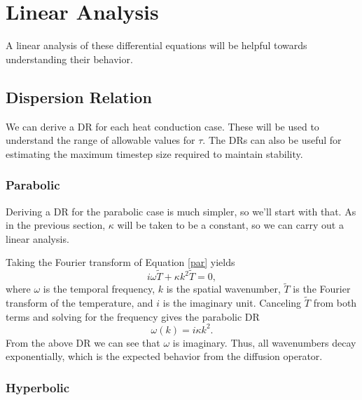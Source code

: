 \documentclass[iop]{emulateapj}
\begin{document}
	\section{Linear Analysis}
	
			A linear analysis of these differential equations will be helpful towards understanding their behavior.
	
		\subsection{Dispersion Relation}
		
				We can derive a \ac{DR} for each heat conduction case.
					These will be used to understand the range of allowable values for $\tau$.
					The \ac{DR}s can also be useful for estimating the maximum timestep size required to maintain stability.
					
			\subsubsection{Parabolic}
			
				Deriving a \ac{DR} for the parabolic case is much simpler, so we'll start with that.
					As in the previous section, $\kappa$ will be taken to be a constant, so we can carry out a linear analysis.
					
				Taking the Fourier transform of Equation \ref{par} yields
				\begin{equation}
					i \omega \tilde{T} + \kappa k^2 \tilde{T} = 0,
				\end{equation}
				where $\omega$ is the temporal frequency, $k$ is the spatial wavenumber, $\tilde{T}$ is the Fourier transform of the temperature, and $i$ is the imaginary unit.
				Canceling $\tilde{T}$ from both terms and solving for the frequency gives the parabolic \ac{DR}
				\begin{equation}
					\omega(k) = i \kappa k^2.
				\end{equation}
				From the above \ac{DR} we can see that $\omega$ is imaginary. Thus, all wavenumbers decay exponentially, which is the expected behavior from the diffusion operator.
			
				
				
			\subsubsection{Hyperbolic}
			
\end{document}
